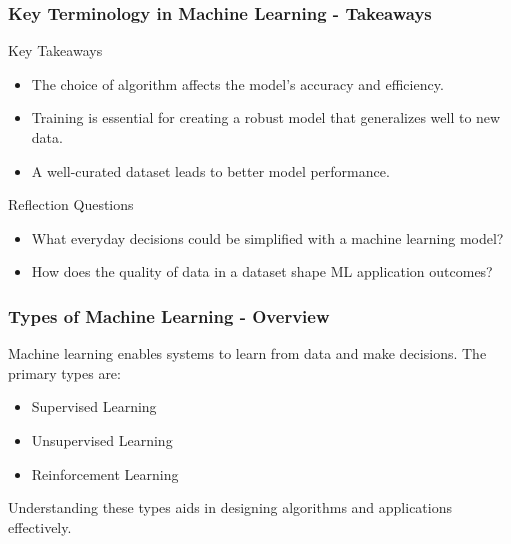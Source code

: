 \documentclass[aspectratio=169]{beamer}
\begin{document}
\begin{frame}[fragile]
    \frametitle{Key Terminology in Machine Learning - Takeaways}
    \begin{block}{Key Takeaways}
        \begin{itemize}
            \item The choice of algorithm affects the model’s accuracy and efficiency.
            \item Training is essential for creating a robust model that generalizes well to new data.
            \item A well-curated dataset leads to better model performance.
        \end{itemize}
    \end{block}
    
    \begin{block}{Reflection Questions}
        \begin{itemize}
            \item What everyday decisions could be simplified with a machine learning model?
            \item How does the quality of data in a dataset shape ML application outcomes?
        \end{itemize}
    \end{block}
\end{frame}

\begin{frame}[fragile]
    \frametitle{Types of Machine Learning - Overview}
    Machine learning enables systems to learn from data and make decisions. The primary types are:
    \begin{itemize}
        \item Supervised Learning
        \item Unsupervised Learning
        \item Reinforcement Learning
    \end{itemize}
    Understanding these types aids in designing algorithms and applications effectively.
\end{frame}
\end{document}
